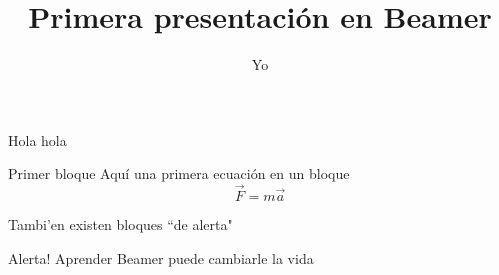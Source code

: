 \documentclass[draft]{beamer}
\begin{document}
\title{Primera presentaci\'on en Beamer}
\author{Yo}
\maketitle

\begin{frame}
Hola hola
\begin{block}{Primer bloque}
Aqu\'i una primera ecuaci\'on en un bloque
\begin{equation}
\vec{F}=m\vec{a}
\end{equation}
\end{block}

\end{frame}

\begin{frame}
Tambi'en existen bloques ``de alerta"
\begin{alertblock}{Alerta!}
Aprender Beamer puede cambiarle la vida
\end{alertblock}
\end{frame}
\end{document}
